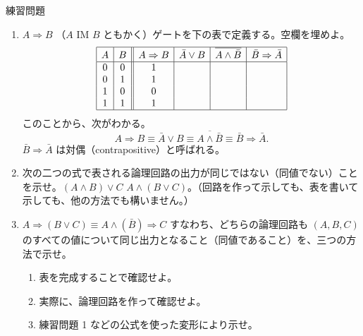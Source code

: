 \documentclass[10pt, dvipdfmx]{beamer}
\begin{document}
\begin{frame}{練習問題}

\begin{enumerate}
\item \(A\Rightarrow B\) （\(A \mbox{ IM } B\) ともかく）ゲートを下の表で定義する。空欄を埋めよ。 
{\small
\[ \begin{array}{|c|c||c|c|c|c|} \hline A  & B  & A\Rightarrow B  & \bar{A} \lor B  & \overline{A \land \bar{B}}  & \bar{B} \Rightarrow \bar{A} \\ \hline 0  & 0  & 1  &  &  & \\ 0  & 1  & 1  &  &  & \\ 1  & 0  & 0  &  &  & \\ 1  & 1  & 1  &  &  & \\ \hline \end{array} \] 
}
このことから、次がわかる。 
\[ A\Rightarrow B \equiv \bar{A} \lor B \equiv \overline{A \land \bar{B}} \equiv \bar{B} \Rightarrow \bar{A}. \] \(\bar{B} \Rightarrow \bar{A}\) は対偶（contrapositive）と呼ばれる。
\item 次の二つの式で表される論理回路の出力が同じではない（同値でない）ことを示せ。$(A\land B) \lor C$ $A\land (B\lor C)$。（回路を作って示しても、表を書いて示しても、他の方法でも構いません。）
\item $A \Rightarrow (B\lor C) \equiv A\land (\bar{B}) \Rightarrow C$ すなわち、どちらの論理回路も $(A, B, C)$ のすべての値について同じ出力となること（同値であること）を、三つの方法で示せ。
\begin{enumerate}
\item 表を完成することで確認せよ。
\item 実際に、論理回路を作って確認せよ。

\item 練習問題 1 などの公式を使った変形により示せ。 
\end{enumerate}
\end{enumerate}
\end{frame}
\end{document}
